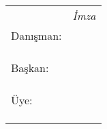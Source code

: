 \begin{titlepage}
\begin{table}[ht!]
\begin{tabular}{ p{} p{}}

				&{\hspace{9.5cm}\footnotesize \textit{İmza}}\\
				
\raggedleft \footnotesize Danışman:		& \small \danisman\\[-35pt]
				&	{\begin{flushright}
					{\footnotesize \danismankarar}
					\end{flushright}}\\[-15pt]
				& {\footnotesize \danismankurum}\\
\cline{2-2}
&\\


\raggedleft \footnotesize Başkan:		& {\small \baskan}\\[-35pt]
			&	{\begin{flushright}
				{\footnotesize \baskankarar}
				\end{flushright}}\\[-15pt]
				& {\footnotesize \baskankurum}\\
\cline{2-2}
&\\

\raggedleft \footnotesize Üye:		& {\small \uyebir}\\[-35pt]
				&	{\begin{flushright}
					{\footnotesize \uyebirkarar}
					\end{flushright}}\\[-15pt]
				& {\footnotesize \uyebirkurum}\\
\cline{2-2}
&\\




\end{tabular}
\end{table}
\end{titlepage}
